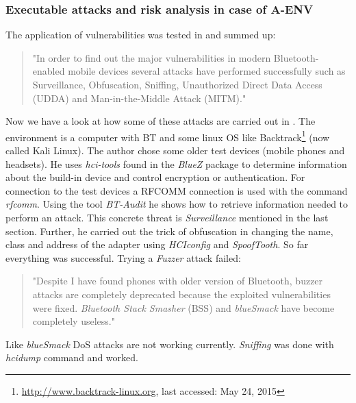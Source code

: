 \documentclass[12pt,a4paper]{article}
\begin{document}
\subsubsection{Executable attacks and risk analysis in case of A-ENV}

The application of vulnerabilities was tested in \cite{DBLP:journals/corr/abs-1206-1482} and summed up:
\begin{quote}
"In order to find out the major vulnerabilities in modern Bluetooth-enabled mobile devices several attacks have performed successfully such as Surveillance, Obfuscation, Sniffing, Unauthorized Direct Data Access (UDDA) and Man-in-the-Middle Attack (MITM)." \cite{DBLP:journals/corr/abs-1206-1482}
\end{quote}
Now we have a look at how some of these attacks are carried out in \cite{DBLP:journals/corr/abs-1206-1482}. The environment is a computer with BT and some linux OS like Backtrack\footnote{\url{http://www.backtrack-linux.org}, last accessed: May 24, 2015} (now called Kali Linux). The author chose some older test devices (mobile phones and headsets). He uses \emph{hci-tools} found in the  \emph{BlueZ} package to determine information about the build-in device and control encryption or authentication. For connection to the test devices a RFCOMM connection is used with the command \emph{rfcomm}. Using the tool \emph{BT-Audit} he shows how to retrieve information needed to perform an attack. This concrete threat is \emph{Surveillance} mentioned in the last section. Further, he carried out the trick of obfuscation in changing the name, class and address of the adapter using \emph{HCIconfig} and \emph{SpoofTooth}. So far everything was successful. Trying a \emph{Fuzzer} attack failed:
\begin{quote}
"Despite I have found phones with older version of Bluetooth, buzzer attacks are completely deprecated because the exploited vulnerabilities were fixed. \emph{Bluetooth Stack Smasher} (BSS) and \emph{blueSmack} have become completely useless." \cite{DBLP:journals/corr/abs-1206-1482}
\end{quote}
Like \emph{blueSmack} DoS attacks are not working currently. \emph{Sniffing} was done with \emph{hcidump} command and worked.
\end{document}

